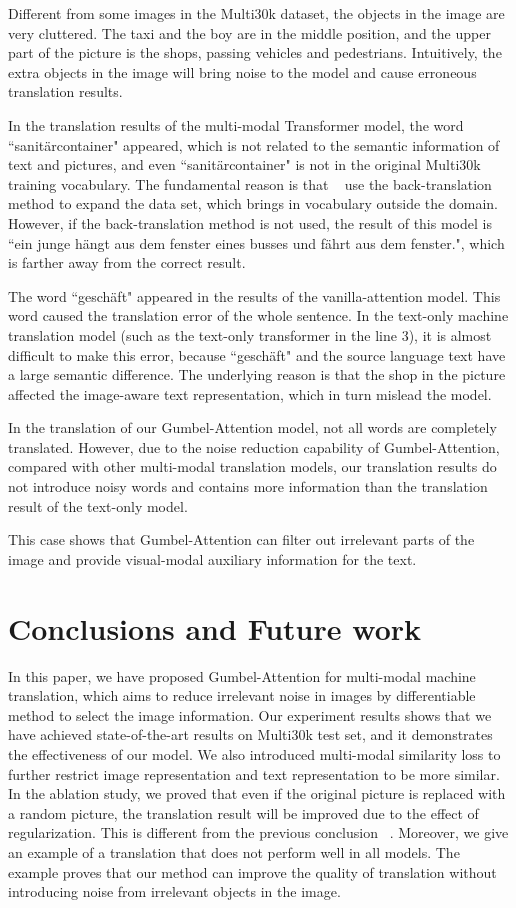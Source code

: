 \documentclass{article}
\begin{document}
Different from some images in the Multi30k dataset, the objects in the image are very cluttered. The taxi and the boy are in the middle position, and the upper part of the picture is the shops, passing vehicles and pedestrians. Intuitively, the extra objects in the image will bring noise to the model and cause erroneous translation results. 

In the translation results of the multi-modal Transformer model, the word ``sanitärcontainer" appeared, which is not related to the semantic information of text and pictures, and even ``sanitärcontainer" is not in the original Multi30k training vocabulary. The fundamental reason is that ~\cite{DBLP:conf/acl/YaoW20} use the back-translation method to expand the data set, which brings in vocabulary outside the domain. However, if the back-translation method is not used, the result of 
this model is ``ein junge hängt aus dem fenster eines busses und fährt aus dem fenster.", which is farther away from the correct result.

The word ``geschäft" appeared in the results of the vanilla-attention model. This word caused the translation error of the whole sentence. In the text-only machine translation model (such as the text-only transformer in the line 3), it is almost difficult to make this error, because ``geschäft" and the source language text have a large semantic difference. The underlying reason is that the shop in the picture affected the image-aware text representation, which in turn mislead the model.

In the translation of our Gumbel-Attention model, not all words are completely translated. However, due to the noise reduction capability of Gumbel-Attention, compared with other multi-modal translation models, our translation results do not introduce noisy words and contains more information than the translation result of the text-only model.

This case shows that Gumbel-Attention can filter out irrelevant parts of the image and provide visual-modal auxiliary information for the text.


\section{Conclusions and Future work}
In this paper, we have proposed Gumbel-Attention for multi-modal machine translation, which aims to reduce irrelevant noise in images by differentiable method to select the image information. Our experiment results shows that we have achieved state-of-the-art results on Multi30k test set, and it demonstrates the effectiveness of our model. We also introduced multi-modal similarity loss to further restrict image representation and text representation to be more similar. In the ablation study, we proved that even if the original picture is replaced with a random picture, the translation result will be improved due to the effect of regularization. This is different from the previous conclusion ~\cite{DBLP:conf/acl/YaoW20}.   Moreover, we give an example of a translation that does not perform well in all models. The example proves that our method can improve the quality of translation without introducing noise from irrelevant objects in the image.
\end{document}
